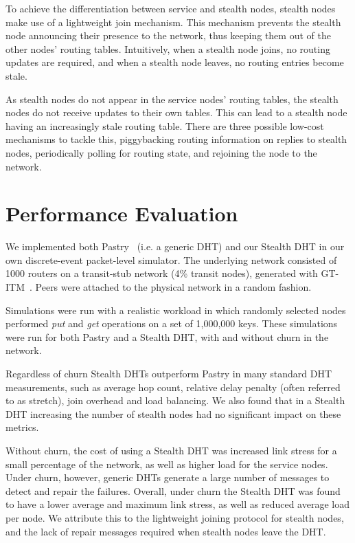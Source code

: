 \documentclass{sig-alt-release}
\begin{document}
To achieve the differentiation between service and stealth nodes,
stealth nodes make use of a lightweight join mechanism. This
mechanism prevents the stealth node announcing their presence to the
network, thus keeping them out of the other nodes' routing tables.
Intuitively, when a stealth node joins, no routing updates are
required, and when a stealth node leaves, no routing entries become
stale.

As stealth nodes do not appear in the service nodes' routing tables,
the stealth nodes do not receive updates to their own tables. This
can lead to a stealth node having an increasingly stale routing
table. There are three possible low-cost mechanisms to tackle this,
piggybacking routing information on replies to stealth nodes,
periodically polling for routing state, and rejoining the node to
the network.

\section{Performance Evaluation}
\label{sect:eval}

We implemented both Pastry~\cite{pastry01} (i.e. a generic DHT) and
our Stealth DHT in our own discrete-event packet-level simulator.
The underlying network consisted of 1000 routers on a transit-stub
network (4\% transit nodes), generated with GT-ITM~\cite{gtitm}.
Peers were attached to the physical network in a random fashion.

Simulations were run with a realistic workload in which randomly
selected nodes performed {\em put} and {\em get} operations on a set
of 1,000,000 keys. These simulations were run for both Pastry and a
Stealth DHT, with and without churn in the network.

Regardless of churn Stealth DHTs outperform Pastry in many standard
DHT measurements, such as average hop count, relative delay penalty
(often referred to as stretch), join overhead and load balancing. We
also found that in a Stealth DHT increasing the number of stealth
nodes had no significant impact on these metrics.

Without churn, the cost of using a Stealth DHT was increased link
stress for a small percentage of the network, as well as higher load
for the service nodes. Under churn, however, generic DHTs generate a
large number of messages to detect and repair the failures. Overall,
under churn the Stealth DHT was found to have a lower average and
maximum link stress, as well as reduced average load per node. We
attribute this to the lightweight joining protocol for stealth
nodes, and the lack of repair messages required when stealth nodes
leave the DHT.
\end{document}
